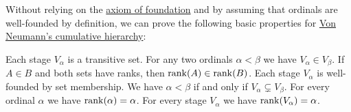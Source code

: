 \begin{proposition}\label{thm:def:cumulative_hierarchy}
  Without relying on the \hyperref[def:zfc/foundation]{axiom of foundation} and by assuming that ordinals are well-founded by definition, we can prove the following basic properties for \hyperref[def:cumulative_hierarchy]{Von Neumann's cumulative hierarchy}:
  \begin{thmenum}
     Each stage \( V_\alpha \) is a transitive set.
     For any two ordinals \( \alpha < \beta \) we have \( V_\alpha \in V_\beta \).
     If \( A \in B \) and both sets have ranks, then \( \operatorname{rank}(A) \in \operatorname{rank}(B) \).
     Each stage \( V_\alpha \) is well-founded by set membership.
     We have \( \alpha < \beta \) if and only if \( V_\alpha \subsetneq V_\beta \).
     For every ordinal \( \alpha \) we have \( \operatorname{rank}(\alpha) = \alpha \).
     For every stage \( V_\alpha \) we have \( \operatorname{rank}(V_\alpha) = \alpha \).
  \end{thmenum}
\end{proposition}
